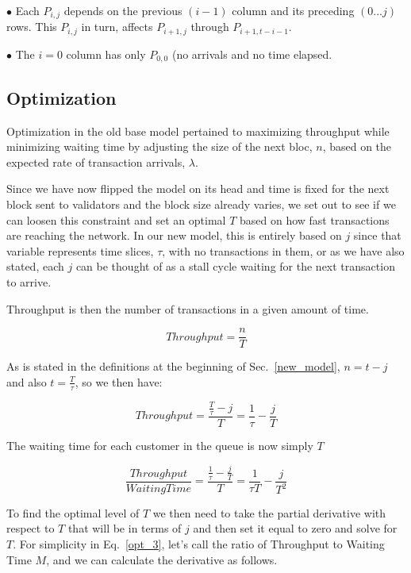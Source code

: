 \documentclass[conference]{IEEEtran}
\begin{document}
$\bullet$ Each $P_{i,j}$ depends on the previous $(i-1)$ column and its 
preceding $(0 ... j)$ rows. This $P_{i,j}$ in turn, affects $P_{i+1,j}$ through
$P_{i+1,t-i-1}$.

$\bullet$ The $i=0$ column has only $P_{0,0}$ (no arrivals and no time 
elapsed.

\subsection{Optimization}\label{optimization}

Optimization in the old base model pertained to maximizing throughput
while minimizing waiting time by adjusting the size of the next bloc, $n$,
based on the expected rate of transaction arrivals, $\lambda$. 

Since we have now flipped the model on its head and time is fixed for the next
block sent to validators and the block size already varies, we set out to see if
we can loosen this constraint and set an optimal $T$ based on how fast 
transactions are reaching the network. In our new model, this is entirely based
on $j$ since that variable represents time slices, $\tau$, with no transactions in them,
or as we have also stated, each $j$ can be thought of as a stall cycle waiting for
the next transaction to arrive.

Throughput is then the number of transactions in a given amount of time. 

\begin{equation}
  Throughput = \frac{n}{T}\label{opt_1}
\end{equation}

As is stated in the definitions at the beginning of Sec.~\ref{new_model},
$n=t-j$ and also $t = \frac{T}{\tau}$, so we then have:

\begin{equation}
  Throughput = \frac{\frac{T}{\tau}-j}{T}=\frac{1}{\tau}-\frac{j}{T}\label{opt_2}
\end{equation}

The waiting time for each customer in the queue is now simply $T$

\begin{equation}
  \frac{Throughput}{WaitingTime} = \frac{\frac{1}{\tau}-\frac{j}{T}}{T} = \frac{1}{\tau T}-\frac{j}{T^2}\label{opt_2}
\end{equation}

To find the optimal level of $T$ we then need to take the partial derivative with respect to $T$ that will
be in terms of $j$ and then set it equal to zero and solve for $T$. For simplicity in Eq.~\ref{opt_3}, 
let's call the ratio of Throughput to Waiting Time $M$, and we can calculate the derivative as follows.
\end{document}
